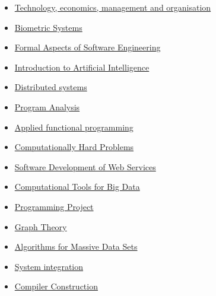 \documentclass{article}
\providecommand{\tightlist}{%
  \setlength{\itemsep}{0pt}\setlength{\parskip}{0pt}}
\begin{document}
\begin{itemize}
\tightlist
\item
  \href{http://kurser.dtu.dk/course/42490}{Technology, economics,
  management and organisation}
\item
  \href{http://kurser.dtu.dk/course/02238}{Biometric Systems}
\item
  \href{http://kurser.dtu.dk/course/02263}{Formal Aspects of Software
  Engineering}
\item
  \href{http://kurser.dtu.dk/course/02180}{Introduction to Artificial
  Intelligence}
\item
  \href{http://kurser.dtu.dk/course/02220}{Distributed systems}
\item
  \href{http://kurser.dtu.dk/course/02242}{Program Analysis}
\item
  \href{http://kurser.dtu.dk/course/02257}{Applied functional
  programming}
\item
  \href{http://kurser.dtu.dk/course/02249}{Computationally Hard
  Problems}
\item
  \href{http://kurser.dtu.dk/course/02267}{Software Development of Web
  Services}
\item
  \href{http://kurser.dtu.dk/course/02807}{Computational Tools for Big
  Data}
\item
  \href{http://kurser.dtu.dk/course/30010}{Programming Project}
\item
  \href{http://kurser.dtu.dk/course/01227}{Graph Theory}
\item
  \href{http://kurser.dtu.dk/course/02282}{Algorithms for Massive Data
  Sets}
\item
  \href{http://kurser.dtu.dk/course/02291}{System integration}
\item
  \href{http://kurser.dtu.dk/course/02247}{Compiler Construction}
\end{itemize}
\end{document}
